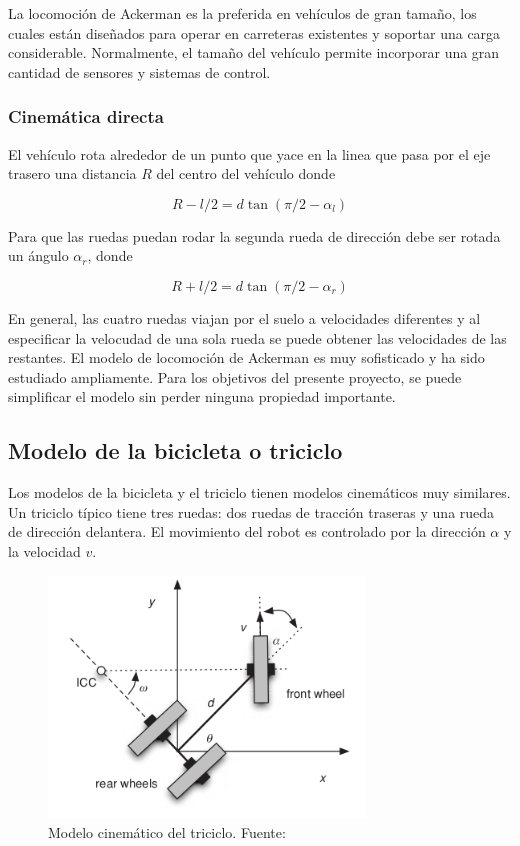     La locomoción de Ackerman es la preferida en vehículos de gran tamaño, los cuales están diseñados para operar en carreteras
    existentes y soportar una carga considerable. Normalmente, el tamaño del vehículo permite incorporar una gran cantidad 
    de sensores y sistemas de control. 
        \subsubsection{Cinemática directa}
        El vehículo rota alrededor de un punto que yace en la linea que pasa por el eje trasero una distancia $R$ del centro 
        del vehículo donde

        \begin{equation*}
            R - l/2 = d \tan{(\pi / 2 - \alpha_l)}
        \end{equation*}

        Para que las ruedas puedan rodar la segunda rueda de dirección debe ser rotada un ángulo $\alpha_r$, donde 

        \begin{equation*}
            R + l/2 = d \tan{(\pi / 2 - \alpha_r)}
        \end{equation*}

        En general, las cuatro ruedas viajan por el suelo a velocidades diferentes y al especificar la velocudad de una sola rueda
        se puede obtener las velocidades de las restantes. El modelo de locomoción de Ackerman es muy sofisticado y ha sido 
        estudiado ampliamente. Para los objetivos del presente proyecto, se puede simplificar el modelo sin perder ninguna 
        propiedad importante.

    \subsection{Modelo de la bicicleta o triciclo} \label{sec:triciclo}
    Los modelos de la bicicleta y el triciclo tienen modelos cinemáticos muy similares. Un triciclo típico tiene tres ruedas: 
    dos ruedas de tracción traseras y una rueda de dirección delantera. El movimiento del robot es controlado por la dirección 
    $\alpha$ y la velocidad $v$.
    \begin{figure}[!h] 
        \centering
        \includegraphics[width=0.75\textwidth]{img/triciclo}
        \caption[Modelo cinemático del triciclo]{Modelo cinemático del triciclo. Fuente: \cite{GregoryMcGillUniversity2010} }
        \label{fig:triciclo}
    \end{figure}    

